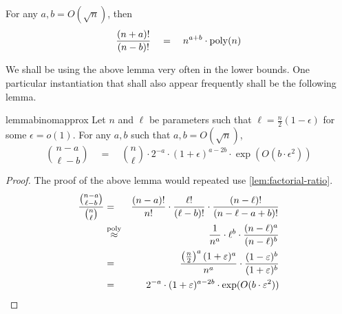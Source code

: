 \begin{lemma}{\cite[Lemma 6]{gkks13}}\label{lem:factorial-ratio} For any $a,b = O(\sqrt{n})$, then
\[
\frac{(n+a)!}{(n-b)!}\quad=\quad n^{a + b} \cdot \operatorname{poly}(n)
\]
\end{lemma}

We shall be using the above lemma very often in the lower bounds. 
One particular instantiation that shall also appear frequently shall be the following lemma.  

\begin{restatable}{lemma}{binomapprox}\label{lem:binom-approx}
Let $n$ and $\ell$ be parameters such that $\ell = \frac{n}{2}(1 - \epsilon)$ for some $\epsilon = o(1)$. 
For any $a, b$ such that $a,b = O(\sqrt{n})$, 
\[
\binom{n - a}{\ell - b} \quad = \quad \binom{n}{\ell} \cdot 2^{-a} \cdot (1+\epsilon)^{a-2b} \cdot \exp(O(b\cdot \epsilon^2))
\]
\end{restatable}
\begin{proof}
The proof of the above lemma would repeated use \autoref{lem:factorial-ratio}. 
\begin{eqnarray*}
\frac{\binom{n-a}{\ell -b}}{\binom{n}{\ell}} & = & \frac{(n-a)!}{n!} \cdot \frac{\ell!}{(\ell -b)!}\cdot \frac{(n-\ell)!}{(n-\ell-a+b)!}\\
& \stackrel{\operatorname{poly}}{\approx}& \frac{1}{n^a} \cdot \ell^b \cdot \frac{(n-\ell)^a}{(n-\ell)^b}\\
& = & \frac{\left(\frac{n}{2}\right)^a(1 +\varepsilon)^a}{n^a} \cdot \frac{(1-\varepsilon)^{b}}{(1+\varepsilon)^b}\\
& = & 2^{-a} \cdot (1+\varepsilon)^{a - 2b} \cdot \exp(O(b\cdot \varepsilon^2))
\end{eqnarray*}
\end{proof}


